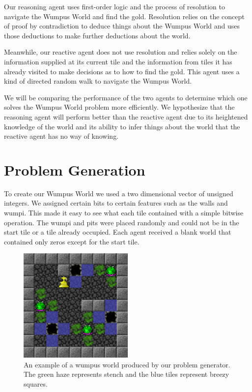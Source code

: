 \documentclass{article}
\begin{document}
		 Our reasoning agent uses first-order logic and the process of resolution to navigate the Wumpus World and find the gold. Resolution relies on the concept of proof by contradiction to deduce things about the Wumpus World and uses those deductions to make further deductions about the world.
		 
		 Meanwhile, our reactive agent does not use resolution and relies solely on the information supplied at its current tile and the information from tiles it has already visited to make decisions as to how to find the gold. This agent uses a kind of directed random walk to navigate the Wumpus World.
		 
		 We will be comparing the performance of the two agents to determine which one solves the Wumpus World problem more efficiently. We hypothesize that the reasoning agent will perform better than the reactive agent due to its heightened knowledge of the world and its ability to infer things about the world that the reactive agent has no way of knowing.
		 


\section{Problem Generation}
To create our Wumpus World we used a two dimensional vector of unsigned integers. We assigned certain bits to certain features such as the walls and wumpi. This made it easy to see what each tile contained with a simple bitwise operation. The wumpi and pits were placed randomly and could not be in the start tile or a tile already occupied. Each agent received a blank world that contained only zeros except for the start tile.
\begin{figure}
	\centering
	\includegraphics[width=0.5\textwidth]{images/ex_ww}
	\caption{An example of a wumpus world produced by our problem generator. The green haze represents stench and the blue tiles represent breezy squares.}
	\label{ex_ww}
\end{figure}
\end{document}
